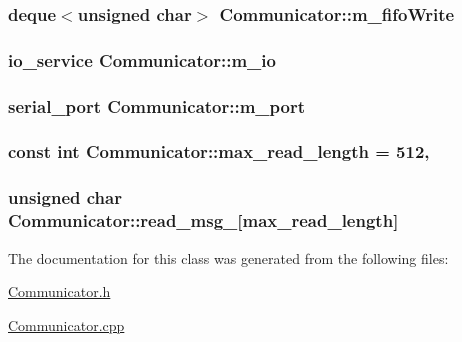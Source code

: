 \hypertarget{classCommunicator_a8f027326373947bb29c68c64e27d7b6a}{
\subsubsection[{m\-\_\-fifo\-Write}]{\setlength{\rightskip}{0pt plus 5cm}deque$<$unsigned char$>$ Communicator\-::m\-\_\-fifo\-Write\hspace{0.3cm}{\ttfamily [private]}}}\label{classCommunicator_a8f027326373947bb29c68c64e27d7b6a}
\hypertarget{classCommunicator_acae03d9f34724b3fcaf98f92c0640e51}{
\subsubsection[{m\-\_\-io}]{\setlength{\rightskip}{0pt plus 5cm}io\-\_\-service Communicator\-::m\-\_\-io\hspace{0.3cm}{\ttfamily [private]}}}\label{classCommunicator_acae03d9f34724b3fcaf98f92c0640e51}
\hypertarget{classCommunicator_ad78da07df6c7551bdc4caefd508f97d1}{
\subsubsection[{m\-\_\-port}]{\setlength{\rightskip}{0pt plus 5cm}serial\-\_\-port Communicator\-::m\-\_\-port\hspace{0.3cm}{\ttfamily [private]}}}\label{classCommunicator_ad78da07df6c7551bdc4caefd508f97d1}
\hypertarget{classCommunicator_a1fa795c1542a7fff4a6b2b66e137b55d}{
\subsubsection[{max\-\_\-read\-\_\-length}]{\setlength{\rightskip}{0pt plus 5cm}const int Communicator\-::max\-\_\-read\-\_\-length = 512\hspace{0.3cm}{\ttfamily [static]}, {\ttfamily [private]}}}\label{classCommunicator_a1fa795c1542a7fff4a6b2b66e137b55d}
\hypertarget{classCommunicator_a6d28d139d03917fa04f9b3c9460dcaae}{
\subsubsection[{read\-\_\-msg\-\_\-}]{\setlength{\rightskip}{0pt plus 5cm}unsigned char Communicator\-::read\-\_\-msg\-\_\-\mbox{[}{\bf max\-\_\-read\-\_\-length}\mbox{]}\hspace{0.3cm}{\ttfamily [private]}}}\label{classCommunicator_a6d28d139d03917fa04f9b3c9460dcaae}


The documentation for this class was generated from the following files\-:\begin{DoxyCompactItemize}
\item 
\hyperlink{Communicator_8h}{Communicator.\-h}\item 
\hyperlink{Communicator_8cpp}{Communicator.\-cpp}\end{DoxyCompactItemize}
